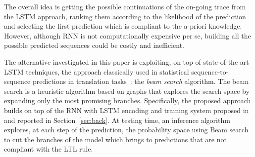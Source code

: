 





The overall idea is getting the possible continuations of the on-going trace from the LSTM approach, ranking them according to the likelihood of the prediction and selecting the first prediction which is compliant to the a-priori knowledge. However, although RNN is not computationally expensive per se, building all the possible predicted sequences could be costly and inefficient.

The alternative investigated in this paper is exploiting, on top of state-of-the-art LSTM techniques, the approach classically used in statistical sequence-to-sequence predictions in translation tasks~\cite{Tillmann2003WRD778822778827}: the \textit{beam search} algorithm. The beam search is a heuristic algorithm based on graphs that explores the search space by expanding only the most promising branches. 
Specifically, the proposed approach builds on top of the RNN with LSTM encoding and training system proposed in~\cite{niek96732} and reported in Section~\ref{sec:back}. At testing time, an inference algorithm explores, at each step of the prediction, the probability space using Beam search to cut the branches of the model which brings to predictions that are not compliant with the LTL rule. 

